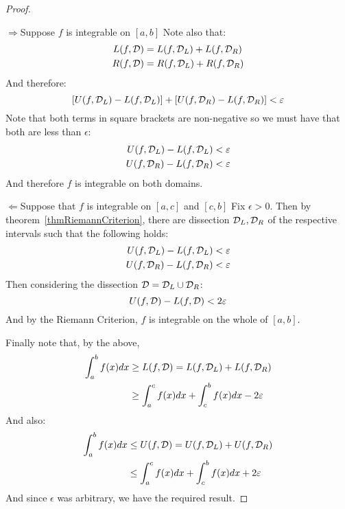 \documentclass[../Main.tex]{subfiles}
\begin{document}
\begin{proof}
\begin{proofdirection}{$\Rightarrow$}{Suppose $f$ is integrable on $[a, b]$}
        Note also that:
        \begin{align*}
            L(f, \mathcal{D}) &= L(f, \mathcal{D}_L) + L(f, \mathcal{D}_R) \\
            R(f, \mathcal{D}) &= R(f, \mathcal{D}_L) + R(f, \mathcal{D}_R)
        \end{align*}
        And therefore:
        \begin{equation*}
            \left[U(f, \mathcal{D}_L) - L(f, \mathcal{D}_L)\right] + \left[U(f, \mathcal{D}_R) - L(f, \mathcal{D}_R)\right] < \varepsilon
        \end{equation*}
        Note that both terms in square brackets are non-negative so we must have that both are less than $\epsilon$:
        \begin{align*}
            U(f, \mathcal{D}_L) - L(f, \mathcal{D}_L) &< \varepsilon \\
            U(f, \mathcal{D}_R) - L(f, \mathcal{D}_R) &< \varepsilon
        \end{align*}
        And therefore $f$ is integrable on both domains.
    \end{proofdirection}
    \begin{proofdirection}{$\Leftarrow$}{Suppose that $f$ is integrable on $[a, c]$ and $[c, b]$}
        Fix $\epsilon > 0$. Then by theorem~\ref{thmRiemannCriterion}, there are dissection $\mathcal{D}_L, \mathcal{D}_R$ of the respective intervals such that the following holds:
        \begin{align*}
            U(f, \mathcal{D}_L) - L(f, \mathcal{D}_L) &< \varepsilon \\
            U(f, \mathcal{D}_R) - L(f, \mathcal{D}_R) &< \varepsilon
        \end{align*}
        Then considering the dissection $\mathcal{D} = \mathcal{D}_L \cup \mathcal{D}_R$:
        \begin{equation*}
            U(f, \mathcal{D}) - L(f, \mathcal{D}) < 2\varepsilon
        \end{equation*}
        And by the Riemann Criterion, $f$ is integrable on the whole of $[a, b]$.
    \end{proofdirection}
    Finally note that, by the above,
    \begin{align*}
        \int_a^b f(x) dx &\geq L(f, \mathcal{D}) = L(f, \mathcal{D}_L) + L(f, \mathcal{D}_R) \\
        &\geq \int_a^c f(x) dx + \int_c^b f(x) dx - 2\varepsilon
    \end{align*}
    And also:
    \begin{align*}
        \int_a^b f(x) dx &\leq U(f, \mathcal{D}) = U(f, \mathcal{D}_L) + U(f, \mathcal{D}_R) \\
        &\leq \int_a^c f(x) dx + \int_c^b f(x) dx + 2\varepsilon
    \end{align*}
    And since $\epsilon$ was arbitrary, we have the required result.
\end{proof}
\end{document}
